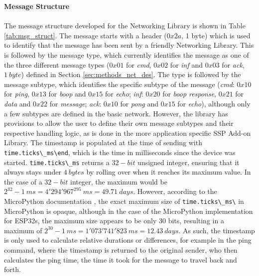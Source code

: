 \textbf{\label{sec:methods_msg_struct}Message Structure}\\\\
The message structure developed for the Networking Library is shown in Table \ref{tab:msg_struct}. The message starts with a header ($0x2a$, 1 byte) which is used to identify that the message has been sent by a friendly Networking Library. 
This is followed by the message type, which currently identifies the message as one of the three different message types ($0x01$ for \textit{cmd}, $0x02$ for \textit{inf} and $0x03$ for \textit{ack}, $1\ byte$) defined in Section \ref{sec:methods_net_des}. 
The type is followed by the message subtype, which identifies the specific subtype of the message (\textit{cmd}: $0x10$ for \textit{ping}, $0x13$ for \textit{boop} and $0x15$ for \textit{echo}; \textit{inf}: $0x20$ for \textit{boop response}, $0x21$ for \textit{data} and $0x22$ for \textit{message}; \textit{ack}: $0x10$ for \textit{pong} and $0x15$ for \textit{echo}), although only a few subtypes are defined in the basic network. However, the library has provisions to allow the user to define their own message subtypes and their respective handling logic, as is done in the more application specific SSP Add-on Library.
The timestamp is populated at the time of sending with \verb!time.ticks\_ms\end!, which is the time in milliseconds since the device was started. \verb!time.ticks\_ms! returns a $32-bit$ unsigned integer, ensuring that it always stays under $4\ bytes$ by rolling over when it reaches its maximum value. In the case of a $32-bit$ integer, the maximum would be $2^{32} -1\ ms = 4'294'967^295\ ms = 49.71\ days$. However, according to the MicroPython documentation \citep{micropython_micropython_2025-2}, the exact maximum size of \verb!time.ticks\_ms\! in MicroPython is opaque, although in the case of the MicroPython implementation for ESP32s, the maximum size appears to be only 30 bits, resulting in a maximum of $2^{30}-1\ ms=1'073'741'823\ ms = 12.43\ days$.
As such, the timestamp is only used to calculate relative durations or differences, for example in the ping command, where the timestamp is returned to the original sender, who then calculates the ping time, the time it took for the message to travel back and forth.
